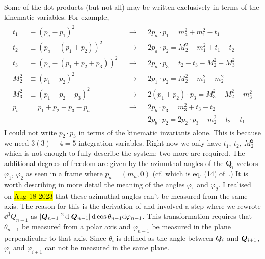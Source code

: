 Some of the dot products (but not all) may be written exclusively in terms of the kinematic variables. For example,
\begin{gather*}
    \begin{align*}
        t_1 &\equiv (p_a - p_1)^2 &&\rightarrow 
            && 2 p_a \cdot p_1 = m_a^2 +  m_1^2 - t_1 \\
        t_2 &\equiv (p_a - (p_1 + p_2))^2 &&\rightarrow 
            && 2 p_a \cdot p_2 = M_2^2 - m_1^2 + t_1 - t_2 \\
        t_3 &\equiv (p_a - (p_1 + p_2 + p_3))^2 &&\rightarrow 
            && 2 p_a \cdot p_3 = t_2 - t_3 - M_2^2 + M_3^2 \\
        M_2^2 &\equiv (p_1 + p_2)^2 &&\rightarrow 
            && 2 p_1 \cdot p_2 = M_2^2 - m_1^2 - m_2^2 \\
        M_3^2 &\equiv (p_1 + p_2 + p_3)^2 &&\rightarrow 
            && 2 (p_1 + p_2) \cdot p_3 = M_3^2 - M_2^2 - m_3^2 \\
        p_b &= p_1 + p_2 + p_3 - p_a &&\rightarrow
            && 2p_b \cdot p_3 = m_3^2 + t_3 - t_2 \\
        & && && 2p_b \cdot p_2 = 2 p_2 \cdot p_3 + m_2^2 + t_2 - t_1
    \end{align*}
\end{gather*}
I could not write $p_2 \cdot p_3$ in terms of the kinematic invariants alone.
This is because we need $3(3) - 4 = 5$ integration variables. Right now we only have $t_1,\ t_2,\ M_2^2$ which is not enough to fully describe the system; two more are required. 
The additional degrees of freedom are given by the azimuthal angles of the $\bm{Q}_i$ vectors $\varphi_1$, $\varphi_2$ as seen in a frame where $p_a = (m_a, \bm{0})$ (cf.  which is eq. (14) of~\cite{Byckling:1969sx}.)
It is worth describing in more detail the meaning of the angles $\varphi_1$ and $\varphi_2$. 
I realised on \hl{Aug 18 2023} that these azimuthal angles can't be measured from the same axis. 
The reason for this is the derivation of  and  involved a step where we rewrote $\dd^3 Q_{n-1}$ as $|\bm{Q}_{n-1}|^2 \, \dd |\bm{Q}_{n-1}| \, \dd \cos \theta_{n-1} \dd \varphi_{n-1}$. 
This transformation requires that $\theta_{n-1}$ be measured from a polar axis and $\varphi_{n-1}$ be measured in the plane perpendicular to that axis.
Since $\theta_{i}$ is defined as the angle between $\bm{Q}_{i}$ and $\bm{Q}_{i+1}$, $\varphi_{i}$ and $\varphi_{i+1}$ can not be measured in the same plane.

